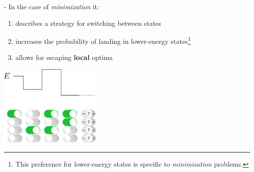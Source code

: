 \begin{frame}{\secname}

\svspace{-5mm}


- In the case of \emph{minimization} it:

\begin{enumerate}
\item describes a strategy for switching between states
\item increases the probability of landing in lower-energy states\footnote{This preference for lower-energy states is specific to \emph{minimization} problems.}
\item allows for escaping \textbf{local} optima
\end{enumerate}


\begin{center}
	\includegraphics[width=5cm]{img/cyberscooty-switch_1-5_next}
\end{center}


\end{frame}

